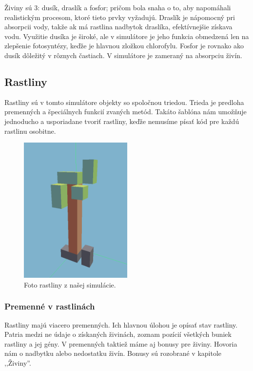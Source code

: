 \documentclass[12pt]{article}
\begin{document}
Živiny sú 3: dusík, draslík a fosfor; pričom bola snaha o to, aby napomáhali
realistickým procesom, ktoré tieto prvky vyžadujú.
Draslík je nápomocný pri absorpcii vody, takže ak má rastlina nadbytok draslíka,
efektívnejšie získava vodu. Využitie dusíka je široké, ale v simulátore
je jeho funkcia obmedzená len na zlepšenie fotosyntézy, keďže je hlavnou
zložkou chlorofylu. Fosfor je rovnako ako dusík dôležitý v rôznych častiach.
V simulátore je zameraný na absorpciu živín.

\newpage
\subsection{Rastliny}

Rastliny sú v tomto simulátore objekty so spoločnou triedou. Trieda je
predloha premenných a špeciálnych funkcií zvaných metód. Takáto šablóna nám umožňuje
jednoducho a usporiadane tvoriť rastliny, keďže nemusíme písať kód pre každú rastlinu
osobitne.

\begin{figure}[ht]
	\centering
	\includegraphics[width=0.5\textwidth]{res/plant.png}
	\caption{Foto rastliny z našej simulácie.}
\end{figure}

\subsubsection{Premenné v rastlinách}

Rastliny majú viacero premenných. Ich hlavnou úlohou je opísať stav rastliny.
Patria medzi ne údaje o získaných živinách, zoznam pozícií všetkých buniek rastliny
a jej gény. V premenných taktiež máme aj bonusy pre živiny.
Hovoria nám o nadbytku alebo nedostatku živín. Bonusy sú rozobrané v kapitole ,,Živiny''.
\end{document}
